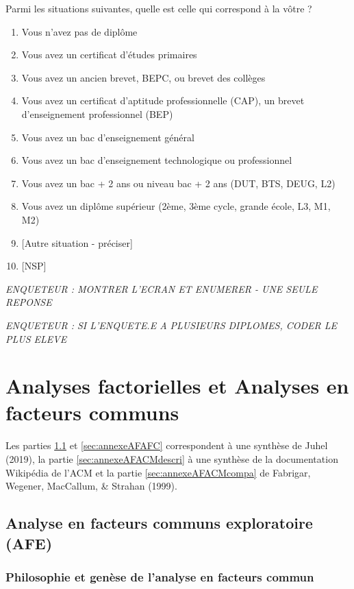 \documentclass[12pt,a4paper]{reedthesis}
\providecommand{\tightlist}{%
  \setlength{\itemsep}{0pt}\setlength{\parskip}{0pt}}
\begin{document}
Parmi les situations suivantes, quelle est celle qui correspond à la vôtre ?
\begin{enumerate}
\def\labelenumi{\arabic{enumi}.}
\tightlist
\item
  Vous n'avez pas de diplôme
\item
  Vous avez un certificat d'études primaires
\item
  Vous avez un ancien brevet, BEPC, ou brevet des collèges
\item
  Vous avez un certificat d'aptitude professionnelle (CAP), un brevet d'enseignement professionnel (BEP)
\item
  Vous avez un bac d'enseignement général
\item
  Vous avez un bac d'enseignement technologique ou professionnel
\item
  Vous avez un bac + 2 ans ou niveau bac + 2 ans (DUT, BTS, DEUG, L2)
\item
  Vous avez un diplôme supérieur (2ème, 3ème cycle, grande école, L3, M1, M2)
\item
  {[}Autre situation - préciser{]}
\item
  {[}NSP{]}
\end{enumerate}
\emph{ENQUETEUR : MONTRER L'ECRAN ET ENUMERER - UNE SEULE REPONSE}

\emph{ENQUETEUR : SI L'ENQUETE.E A PLUSIEURS DIPLOMES, CODER LE PLUS ELEVE}

\hypertarget{annexeAF}{%
\chapter{Analyses factorielles et Analyses en facteurs communs}\label{annexeAF}}
\begin{encadre}
Les parties \ref{sec:annexeAFAFE} et \ref{sec:annexeAFAFC} correspondent à une synthèse de Juhel (2019), la partie \ref{sec:annexeAFACMdescri} à une synthèse de la documentation Wikipédia de l'ACM et la partie \ref{sec:annexeAFACMcompa} de Fabrigar, Wegener, MacCallum, \& Strahan (1999).

\end{encadre}
\hypertarget{sec:annexeAFAFE}{%
\section{Analyse en facteurs communs exploratoire (AFE)}\label{sec:annexeAFAFE}}

\hypertarget{philosophie-et-genuxe8se-de-lanalyse-en-facteurs-commun}{%
\subsection{Philosophie et genèse de l'analyse en facteurs commun}\label{philosophie-et-genuxe8se-de-lanalyse-en-facteurs-commun}}
\end{document}
